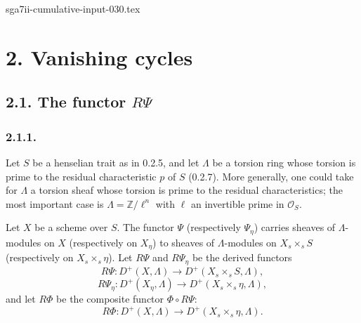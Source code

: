 \begin{filecontents*}{sga7ii-cumulative-input-030.tex}
\section*{2. Vanishing cycles}

\subsection*{2.1. The functor $R\Psi$}

\subsubsection*{2.1.1.}
Let $S$ be a henselian trait as in 0.2.5, and let $\Lambda$ be a
torsion ring whose torsion is prime to the residual characteristic
$p$ of $S$ (0.2.7).  More generally, one could take for $\Lambda$ a
torsion sheaf whose torsion is prime to the residual characteristics;
the most important case is
$\Lambda=\mathbb Z/\ell^n$ with $\ell$ an invertible prime in
$\mathcal O_S$.

Let $X$ be a scheme over $S$.  The functor $\Psi$ (respectively
$\Psi_\eta$) carries sheaves of $\Lambda$-modules on $X$
(respectively on $X_\eta$) to sheaves of $\Lambda$-modules on
$X_s\times_sS$ (respectively on $X_s\times_s\eta$).  Let $R\Psi$ and
$R\Psi_\eta$ be the derived functors
\begin{equation*}
R\Psi:D^+(X,\Lambda)\longrightarrow D^+(X_s\times_sS,\Lambda),
\end{equation*}
\begin{equation*}
R\Psi_\eta:D^+(X_\eta,\Lambda)
\longrightarrow D^+(X_s\times_s\eta,\Lambda),
\end{equation*}
and let $R\Phi$ be the composite functor $\Phi\circ R\Psi$:
\begin{equation*}
R\Phi:D^+(X,\Lambda)
\longrightarrow D^+(X_s\times_s\eta,\Lambda).
\end{equation*}


\end{filecontents*}
